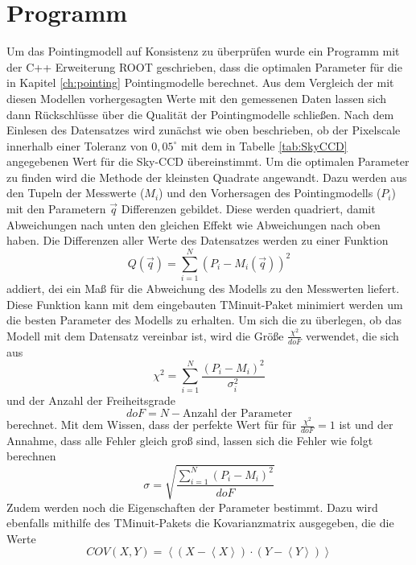 \section{Programm}
Um das Pointingmodell auf Konsistenz zu überprüfen wurde ein Programm mit der C++ Erweiterung ROOT geschrieben, dass die optimalen Parameter für die in Kapitel \ref{ch:pointing} Pointingmodelle berechnet. Aus dem Vergleich der mit diesen Modellen vorhergesagten Werte mit den gemessenen Daten lassen sich dann Rückschlüsse über die Qualität der Pointingmodelle schließen. Nach dem Einlesen des Datensatzes wird zunächst wie oben beschrieben, ob der Pixelscale innerhalb einer Toleranz von $0,05^{\circ}$ mit dem in Tabelle \ref{tab:SkyCCD} angegebenen Wert für die Sky-CCD übereinstimmt. Um die optimalen Parameter zu finden wird die Methode der kleinsten Quadrate angewandt. Dazu werden  aus den Tupeln der Messwerte ($M_i$) und den Vorhersagen des Pointingmodells ($P_i$) mit den Parametern $\vec{q}$ Differenzen gebildet. Diese werden quadriert, damit Abweichungen nach unten den gleichen Effekt wie Abweichungen nach oben haben. Die Differenzen aller Werte des Datensatzes werden zu einer Funktion
\begin{equation}
Q(\vec{q})=\sum^N_{i=1}\left(P_i-M_i(\vec{q})\right)^2
\end{equation}
addiert, dei ein Maß für die Abweichung des Modells zu den Messwerten liefert. Diese Funktion kann mit dem eingebauten TMinuit-Paket minimiert werden um die besten Parameter des Modells zu erhalten. Um sich die zu überlegen, ob das Modell mit dem Datensatz vereinbar ist, wird die Größe $\frac{\chi^2}{doF}$ verwendet, die sich aus 
\begin{equation}
\chi^2=\sum^N_{i=1}\frac{\left(P_i-M_i\right)^2}{\sigma_i^2}
\end{equation}
und der Anzahl der Freiheitsgrade
\begin{equation}
doF=N-\textrm{Anzahl der Parameter}
\end{equation}
berechnet. Mit dem Wissen, dass der perfekte Wert für für $\frac{\chi^2}{doF}=1$ ist und der Annahme, dass alle Fehler gleich groß sind, lassen sich die Fehler wie folgt berechnen
\begin{equation}
\sigma=\sqrt{\frac{\sum^N_{i=1}\left(P_i-M_i\right)^2}{doF}}
\end{equation}
Zudem werden noch die Eigenschaften der Parameter bestimmt. Dazu wird ebenfalls mithilfe des TMinuit-Pakets die Kovarianzmatrix ausgegeben, die die Werte
\begin{equation}
COV(X,Y)=\left<\left(X-\left<X\right>\right)\cdot\left(Y-\left<Y\right>\right)\right>
\end{equation}
